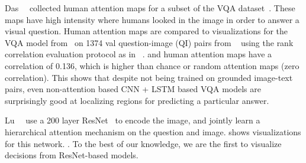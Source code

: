 \noindent {}
Das~\etal~\cite{vqahat} collected human attention maps for a subset of the VQA dataset~\cite{antol2015vqa}.
These maps have high intensity where humans looked in the image in order to answer a visual question.
Human attention maps are compared to \gcam{} visualizations for the VQA model from~\cite{Lu2015}
on 1374 val question-image (QI) pairs from ~\cite{antol2015vqa} using the rank correlation evaluation protocol as in ~\cite{vqahat}.
\gcam{} and human attention maps have a correlation of 0.136, which is higher than chance or random attention maps (zero correlation).
This shows that despite not being trained on grounded image-text pairs, even non-attention based
CNN + LSTM based VQA models are surprisingly good at localizing regions for predicting a particular answer.

\noindent {}
    Lu~\etal~\cite{Lu2016} use a 200 layer ResNet~\cite{he_cvpr15} to encode the image, and jointly learn a hierarchical attention mechanism on the question and image.  shows \gcam{} visualizations for this network.
    .
    To the best of our knowledge, we are the first to visualize decisions from ResNet-based models.





    
